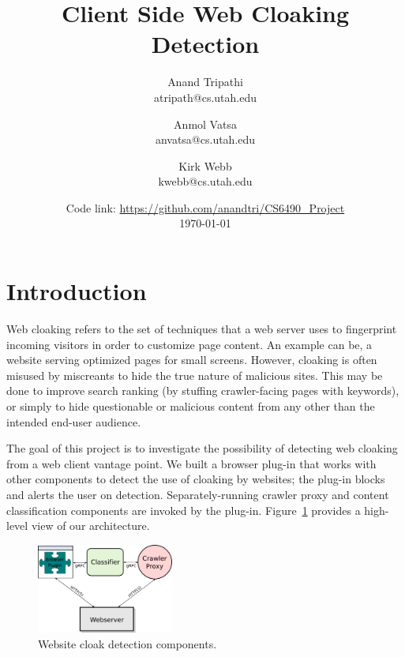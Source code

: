 \documentclass[letterpaper,twocolumn,10pt]{article}
\title{\vspace{-2.0cm}Client Side Web Cloaking Detection}
\author{
Anand Tripathi\\
       atripath@cs.utah.edu
\and
Anmol Vatsa\\
       anvatsa@cs.utah.edu
\and
Kirk Webb\\
       kwebb@cs.utah.edu
}
\date{Code link: \url{https://github.com/anandtri/CS6490\_Project}\\
\today}
\begin{document}
\maketitle

\section{Introduction}
Web cloaking refers to the set of techniques that a web server uses to fingerprint incoming visitors in order to customize page content. An example can be, a website serving optimized pages for small screens. However, cloaking is often misused by miscreants to hide the true nature of malicious sites.  This may be done to improve search ranking (by stuffing crawler-facing pages with keywords), or simply to hide questionable or malicious content from any other than the intended end-user audience.


The goal of this project is to investigate the possibility of detecting web cloaking from a web client vantage point.  We built a browser plug-in that works with other components to detect the use of cloaking by websites; the plug-in blocks and alerts the user on detection. Separately-running crawler proxy and content classification components are invoked by the plug-in.  Figure~\ref{fig:arch} provides a high-level view of our architecture.

\begin{figure}[ht]
  \centering
  \includegraphics[width=0.4\textwidth]{./proj-diagram.png}
  \caption{Website cloak detection components.}
  \label{fig:arch}
\end{figure}
\end{document}
